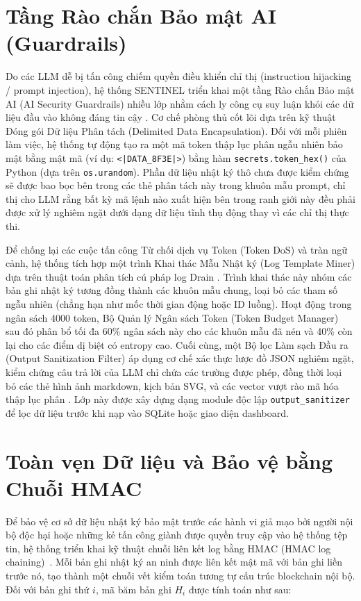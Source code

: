 \section{Tầng Rào chắn Bảo mật AI (Guardrails)}

Do các LLM dễ bị tấn công chiếm quyền điều khiển chỉ thị (instruction hijacking / prompt injection), hệ thống SENTINEL triển khai một tầng Rào chắn Bảo mật AI (AI Security Guardrails) nhiều lớp nhằm cách ly công cụ suy luận khỏi các dữ liệu đầu vào không đáng tin cậy \cite{promptinjection2023}. Cơ chế phòng thủ cốt lõi dựa trên kỹ thuật Đóng gói Dữ liệu Phân tách (Delimited Data Encapsulation). Đối với mỗi phiên làm việc, hệ thống tự động tạo ra một mã token thập lục phân ngẫu nhiên bảo mật bằng mật mã (ví dụ: \texttt{<|DATA\_8F3E|>}) bằng hàm \texttt{secrets.token\_hex()} của Python (dựa trên \texttt{os.urandom}). Phần dữ liệu nhật ký thô chưa được kiểm chứng sẽ được bao bọc bên trong các thẻ phân tách này trong khuôn mẫu prompt, chỉ thị cho LLM rằng bất kỳ mã lệnh nào xuất hiện bên trong ranh giới này đều phải được xử lý nghiêm ngặt dưới dạng dữ liệu tĩnh thụ động thay vì các chỉ thị thực thi.

Để chống lại các cuộc tấn công Từ chối dịch vụ Token (Token DoS) và tràn ngữ cảnh, hệ thống tích hợp một trình Khai thác Mẫu Nhật ký (Log Template Miner) dựa trên thuật toán phân tích cú pháp log Drain \cite{he2017drain}. Trình khai thác này nhóm các bản ghi nhật ký tương đồng thành các khuôn mẫu chung, loại bỏ các tham số ngẫu nhiên (chẳng hạn như mốc thời gian động hoặc ID luồng). Hoạt động trong ngân sách 4000 token, Bộ Quản lý Ngân sách Token (Token Budget Manager) sau đó phân bổ tối đa 60\% ngân sách này cho các khuôn mẫu đã nén và 40\% còn lại cho các điểm dị biệt có entropy cao. Cuối cùng, một Bộ lọc Làm sạch Đầu ra (Output Sanitization Filter) áp dụng cơ chế xác thực lược đồ JSON nghiêm ngặt, kiểm chứng câu trả lời của LLM chỉ chứa các trường được phép, đồng thời loại bỏ các thẻ hình ảnh markdown, kịch bản SVG, và các vector vượt rào mã hóa thập lục phân \cite{watchtower2026}. Lớp này được xây dựng dạng module độc lập \texttt{output\_sanitizer} để lọc dữ liệu trước khi nạp vào SQLite hoặc giao diện dashboard.

\section{Toàn vẹn Dữ liệu và Bảo vệ bằng Chuỗi HMAC}

Để bảo vệ cơ sở dữ liệu nhật ký bảo mật trước các hành vi giả mạo bởi người nội bộ độc hại hoặc những kẻ tấn công giành được quyền truy cập vào hệ thống tệp tin, hệ thống triển khai kỹ thuật chuỗi liên kết log bằng HMAC (HMAC log chaining)~\cite{hmac1997}. Mỗi bản ghi nhật ký an ninh được liên kết mật mã với bản ghi liền trước nó, tạo thành một chuỗi vết kiểm toán tương tự cấu trúc blockchain nội bộ. Đối với bản ghi thứ $i$, mã băm bản ghi $H_i$ được tính toán như sau:


